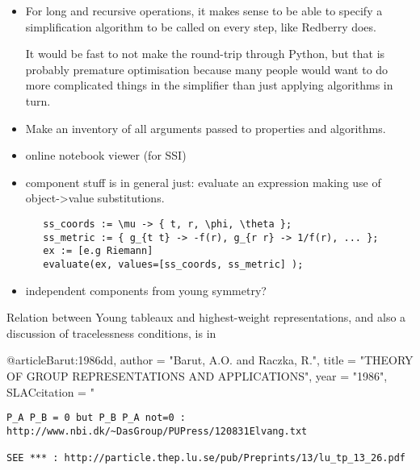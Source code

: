 \documentclass[11pt]{article}
\begin{document}
\begin{itemize}
\item For long and recursive operations, it makes sense to be able to specify a simplification
algorithm to be called on every step, like Redberry does.

%      
% 
  
It would be fast to not make the round-trip through Python, but that
is probably premature optimisation because many people would want to
do more complicated things in the simplifier than just applying
algorithms in turn.

\item Make an inventory of all arguments passed to properties and algorithms.

\item online notebook viewer (for SSI)

\item component stuff is in general just: evaluate an expression
  making use of object->value substitutions. 

\begin{verbatim}
   ss_coords := \mu -> { t, r, \phi, \theta };
   ss_metric := { g_{t t} -> -f(r), g_{r r} -> 1/f(r), ... };
   ex := [e.g Riemann]
   evaluate(ex, values=[ss_coords, ss_metric] );
\end{verbatim}

\item independent components from young symmetry?

\end{itemize}


Relation between Young tableaux and highest-weight representations,
and also a discussion of tracelessness conditions, is in 

@article{Barut:1986dd,
      author         = "Barut, A.O. and Raczka, R.",
      title          = "{THEORY OF GROUP REPRESENTATIONS AND APPLICATIONS}",
      year           = "1986",
      SLACcitation   = "%
}

\begin{verbatim}
P_A P_B = 0 but P_B P_A not=0 :
http://www.nbi.dk/~DasGroup/PUPress/120831Elvang.txt

SEE *** : http://particle.thep.lu.se/pub/Preprints/13/lu_tp_13_26.pdf
\end{verbatim}
\end{document}
